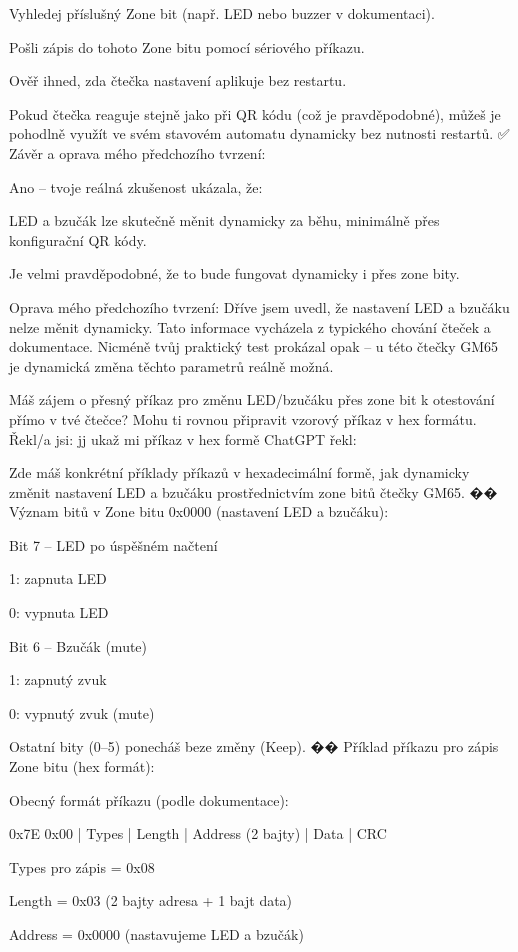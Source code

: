     Vyhledej příslušný Zone bit (např. LED nebo buzzer v dokumentaci).

    Pošli zápis do tohoto Zone bitu pomocí sériového příkazu.

    Ověř ihned, zda čtečka nastavení aplikuje bez restartu.

Pokud čtečka reaguje stejně jako při QR kódu (což je pravděpodobné), můžeš je pohodlně využít ve svém stavovém automatu dynamicky bez nutnosti restartů.
✅ Závěr a oprava mého předchozího tvrzení:

Ano – tvoje reálná zkušenost ukázala, že:

    LED a bzučák lze skutečně měnit dynamicky za běhu, minimálně přes konfigurační QR kódy.

    Je velmi pravděpodobné, že to bude fungovat dynamicky i přes zone bity.

Oprava mého předchozího tvrzení:
Dříve jsem uvedl, že nastavení LED a bzučáku nelze měnit dynamicky. Tato informace vycházela z typického chování čteček a dokumentace. Nicméně tvůj praktický test prokázal opak – u této čtečky GM65 je dynamická změna těchto parametrů reálně možná.

Máš zájem o přesný příkaz pro změnu LED/bzučáku přes zone bit k otestování přímo v tvé čtečce? Mohu ti rovnou připravit vzorový příkaz v hex formátu.
Řekl/a jsi:
jj ukaž mi příkaz v hex formě
ChatGPT řekl:

Zde máš konkrétní příklady příkazů v hexadecimální formě, jak dynamicky změnit nastavení LED a bzučáku prostřednictvím zone bitů čtečky GM65.
�� Význam bitů v Zone bitu 0x0000 (nastavení LED a bzučáku):

    Bit 7 – LED po úspěšném načtení

        1: zapnuta LED

        0: vypnuta LED

    Bit 6 – Bzučák (mute)

        1: zapnutý zvuk

        0: vypnutý zvuk (mute)

Ostatní bity (0–5) ponecháš beze změny (Keep).
��️ Příklad příkazu pro zápis Zone bitu (hex formát):

Obecný formát příkazu (podle dokumentace):

0x7E 0x00 | Types | Length | Address (2 bajty) | Data | CRC

    Types pro zápis = 0x08

    Length = 0x03 (2 bajty adresa + 1 bajt data)

    Address = 0x0000 (nastavujeme LED a bzučák)

